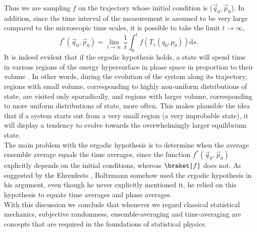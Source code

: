 Thus we are sampling $f$ on the trajectory whose initial condition is ($\vec{q}_0, \vec{p}_0$). In addition, since the time interval of the measurement is assumed to be very large compared to the microscopic time scales, it is possible to take the limit $t\to\infty$,
\begin{equation}
f^{*}\left(\vec{q}_{0},\vec{p}_{0}\right)=\lim _{t \rightarrow \infty} \frac{1}{t} \int_{0}^{t} f\left(T_{s}\left(q_{0}, p_{0}\right)\right) \mathrm{d} s.
\label{CH1:Ergodicity_1}
\end{equation}
It is indeed evident that if the ergodic hypothesis holds, a state will spend time in various regions of the energy hypersurface in phase space in proportion to their volume \cite{oliveira_ergodic_2007, engelhardt_simple_2015, gallavotti_statistical_1999,goldstein_boltzmanns_2001,uffink_handbook_2007}. In other words, during the evolution of the system along its trajectory, regions with small volume, corresponding to highly non-uniform distributions of state, are visited only sporadically, and regions with larger volume, corresponding to more uniform distributions of state, more often. This makes plausible the idea that if a system starts out from a very small region (a very improbable state), it will display a tendency to evolve towards the overwhelmingly larger equilibrium state. \\
\indent The main problem with the ergodic hypothesis is to determine when the average ensemble average equals the time averages, since the function $f^{*}(\vec{q}_{0},\vec{p}_{0})$ explicitly depends on the initial conditions, whereas $\braket{f}$ does not. As suggested by the Ehrenfests \cite{ehrenfest_conceptual_1959}, Boltzmann somehow used the ergodic hypothesis in his argument, even though he never explicitly mentioned it, he relied on this hypothesis to equate time averages and phase averages.\\
\indent With this discussion we conclude that whenever we regard classical statistical mechanics, subjective randomness, ensemble-averaging and time-averaging are concepts that are required in the foundations of  statistical physics.

